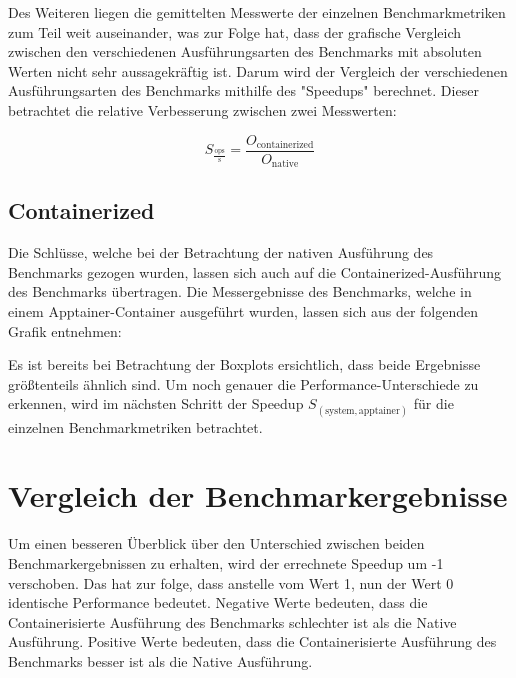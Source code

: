 Des Weiteren liegen die gemittelten Messwerte der einzelnen Benchmarkmetriken zum Teil weit auseinander, was zur Folge hat, dass der grafische Vergleich zwischen den verschiedenen Ausführungsarten des Benchmarks mit absoluten Werten nicht sehr aussagekräftig ist. Darum wird der Vergleich der verschiedenen Ausführungsarten des Benchmarks mithilfe des "Speedups" berechnet. Dieser betrachtet die relative Verbesserung zwischen zwei Messwerten: 


\begin{equation}
S_{\frac{\text{ops}}{\text{s}}} = \frac{O_{\text{containerized}}}{O_{\text{native}}}
\end{equation}


\subsection{Containerized}

Die Schlüsse, welche bei der Betrachtung der nativen Ausführung des Benchmarks gezogen wurden, lassen sich auch auf die Containerized-Ausführung des Benchmarks übertragen. Die Messergebnisse des Benchmarks, welche in einem Apptainer-Container ausgeführt wurden, lassen sich aus der folgenden Grafik entnehmen:









Es ist bereits bei Betrachtung der Boxplots ersichtlich, dass beide Ergebnisse größtenteils ähnlich sind. Um noch genauer die Performance-Unterschiede zu erkennen, wird im nächsten Schritt der Speedup $S_(\text{system}, \text{apptainer})$ für die einzelnen Benchmarkmetriken betrachtet.

\section{Vergleich der Benchmarkergebnisse}

Um einen besseren Überblick über den Unterschied zwischen beiden Benchmarkergebnissen zu erhalten, wird der errechnete Speedup um -1 verschoben. Das hat zur folge, dass anstelle vom Wert 1, nun der Wert 0 identische Performance bedeutet. 
Negative Werte bedeuten, dass die Containerisierte Ausführung des Benchmarks schlechter ist als die Native Ausführung. Positive Werte bedeuten, dass die Containerisierte Ausführung des Benchmarks besser ist als die Native Ausführung. 

